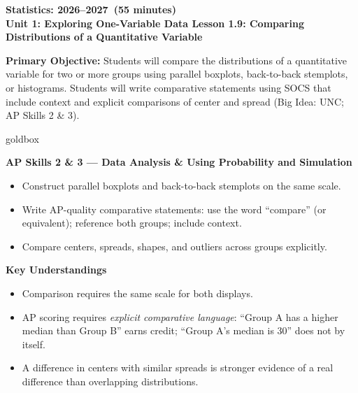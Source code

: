 \documentclass[10pt]{article}
\begin{document}
\def\CourseName{Statistics}
\def\SchoolYear{2026--2027}
\def\MeetingLength{55 minutes}
\newcommand{\UnitNumberName}{Unit 1: Exploring One-Variable Data \quad}
\newcommand{\LessonNumberName}{Lesson 1.9: Comparing Distributions of a Quantitative Variable}

\begin{center}
    {\Large\bfseries \CourseName: \SchoolYear\ (\MeetingLength) \\
    {\small\bfseries \UnitNumberName \LessonNumberName}}
\end{center}

\begin{tcolorbox}[colback=sky,colframe=navy,boxrule=0.9pt,arc=2mm,
    left=2mm,right=2mm,top=1.5mm,bottom=1.5mm]
    \textbf{Primary Objective:} Students will compare the distributions of a quantitative variable
    for two or more groups using parallel boxplots, back-to-back stemplots, or histograms. Students
    will write comparative statements using SOCS that include context and explicit comparisons of
    center and spread (Big Idea: UNC; AP Skills 2 \& 3).
\end{tcolorbox}

\boxguard
\begin{skillbox}{goldbox}
\begin{minipage}[t]{0.48\linewidth}
    \textbf{AP Skills 2 \& 3 --- Data Analysis \& Using Probability and Simulation}
    \begin{itemize}
        \item Construct parallel boxplots and back-to-back stemplots on the same scale.
        \item Write AP-quality comparative statements: use the word ``compare'' (or equivalent); reference both groups; include context.
        \item Compare centers, spreads, shapes, and outliers across groups explicitly.
    \end{itemize}
\end{minipage}
\hfill
\begin{minipage}[t]{0.48\linewidth}
    \textbf{Key Understandings}
    \begin{itemize}
        \item Comparison requires the same scale for both displays.
        \item AP scoring requires \textit{explicit comparative language}: ``Group A has a higher median than Group B'' earns credit; ``Group A's median is 30'' does not by itself.
        \item A difference in centers with similar spreads is stronger evidence of a real difference than overlapping distributions.
    \end{itemize}
\end{minipage}
\end{skillbox}
\end{document}
